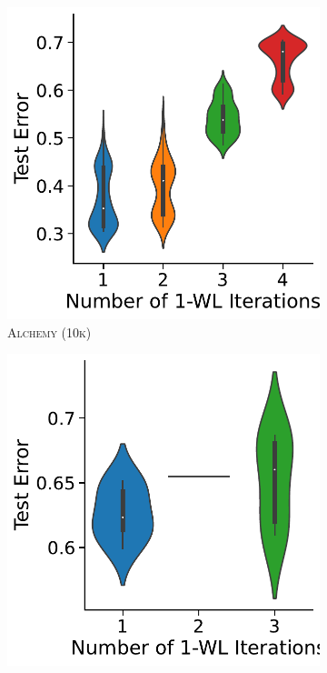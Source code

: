 \begin{figure}[!b]
\begin{subfigure}[b]{0.19\textwidth}
        \caption{\scriptsize \reddit}
	\end{subfigure}
	\hfill
	\begin{subfigure}[b]{0.19\textwidth}
		\centering
		\includegraphics[width=\textwidth]{Figures/k_wl_violin_Alchemy10K.pdf}
        \caption{\scriptsize\textsc{Alchemy (10k)}}
	\end{subfigure}
	\hfill
	\begin{subfigure}[b]{0.19\textwidth}
		\centering
		\includegraphics[width=\textwidth]{Figures/k_wl_violin_Alchemy.pdf}

\end{subfigure}
\end{figure}
